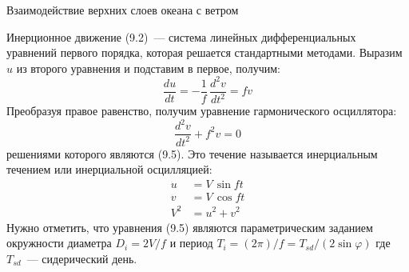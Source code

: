 \begin{chapter}{Взаимодействие верхних слоев океана с ветром}
\begin{section}{Инерционное движение}
(9.2)~--- система линейных дифференциальных уравнений первого порядка,
 которая решается стандартными методами. Выразим~$u$ из второго
 уравнения и подставим в первое, получим:
\begin{displaymath}
 \frac{du}{dt}=-\frac{1}{f}\,\frac{d^2v}{dt^2}=fv
\end{displaymath}
Преобразуя правое равенство, получим уравнение гармонического
осциллятора:
\begin{equation}
 \frac{d^2v}{dt^2} + f^2v = 0
\end{equation}
решениями которого являются (9.5). Это течение называется инерциальным
течением или инерциальной осцилляцией:
\begin{equation}
\boxed{\begin{aligned}
u &= V\, \sin ft \\
v &= V\, \cos ft \\
V^2  &= u^2+v^2 \end{aligned}}
\end{equation}
Нужно отметить, что уравнения (9.5) являются параметрическим заданием
окружности диаметра $D_i = 2V/f$ и период 
$T_i = (2\pi)/f = T_{sd}/(2\sin\varphi)$ где
$T_{sd}$~--- сидерический день.
%


\end{section}
\end{chapter}
